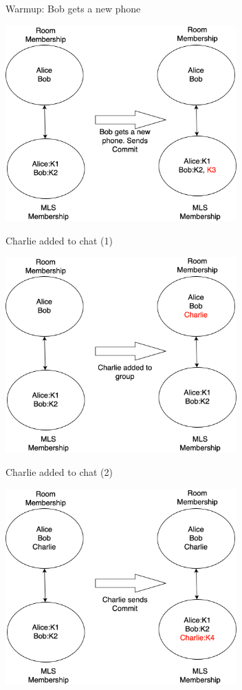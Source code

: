 \documentclass[helvetica]{beamer}
\begin{document}
\begin{frame}{Warmup: Bob gets a new phone}

  \includegraphics[width=3.5in]{MIMI-new-phone}
\end{frame}

\begin{frame}{Charlie added to chat (1)}

  \includegraphics[width=3.5in]{MIMI-new-user-1}
\end{frame}

\begin{frame}{Charlie added to chat (2)}

  \includegraphics[width=3.5in]{MIMI-new-user-2}
\end{frame}
\end{document}
